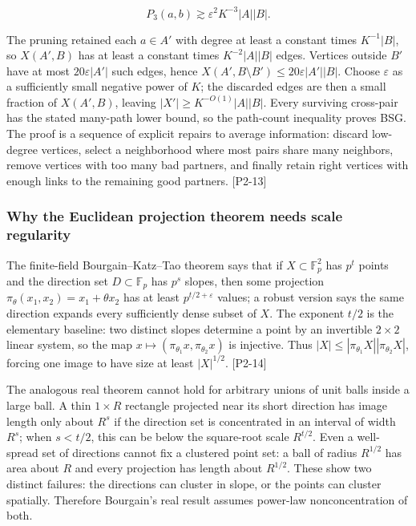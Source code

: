\[P_3(a,b)\gtrsim \varepsilon^2K^{-3}|A||B|.\]

The pruning retained each \(a\in A'\) with degree at least a constant times \(K^{-1}|B|\), so \(X(A',B)\) has at least a constant times \(K^{-2}|A||B|\) edges. Vertices outside \(B'\) have at most \(20\varepsilon|A'|\) such edges, hence \(X(A',B\setminus B')\le20\varepsilon|A'||B|\). Choose \(\varepsilon\) as a sufficiently small negative power of \(K\); the discarded edges are then a small fraction of \(X(A',B)\), leaving \(|X'|\ge K^{-O(1)}|A||B|\). Every surviving cross-pair has the stated many-path lower bound, so the path-count inequality proves BSG. The proof is a sequence of explicit repairs to average information: discard low-degree vertices, select a neighborhood where most pairs share many neighbors, remove vertices with too many bad partners, and finally retain right vertices with enough links to the remaining good partners. {[}P2-13{]}

\subsubsection{Why the Euclidean projection theorem needs scale regularity}\label{04-visual-computing-ii-ch033-why-the-euclidean-projection-theorem-needs-scale-regularity-1}

\hypertarget{04-visual-computing-ii-ch033-why-the-euclidean-projection-theorem-needs-scale-regularity-1}{}

The finite-field Bourgain--Katz--Tao theorem says that if \(X\subset\mathbb F_p^2\) has \(p^t\) points and the direction set \(D\subset\mathbb F_p\) has \(p^s\) slopes, then some projection \(\pi_\theta(x_1,x_2)=x_1+\theta x_2\) has at least \(p^{t/2+\varepsilon}\) values; a robust version says the same direction expands every sufficiently dense subset of \(X\). The exponent \(t/2\) is the elementary baseline: two distinct slopes determine a point by an invertible \(2\times2\) linear system, so the map \(x\mapsto(\pi_{\theta_1}x,\pi_{\theta_2}x)\) is injective. Thus \(|X|\le |\pi_{\theta_1}X||\pi_{\theta_2}X|\), forcing one image to have size at least \(|X|^{1/2}\). {[}P2-14{]}

The analogous real theorem cannot hold for arbitrary unions of unit balls inside a large ball. A thin \(1\times R\) rectangle projected near its short direction has image length only about \(R^s\) if the direction set is concentrated in an interval of width \(R^s\); when \(s<t/2\), this can be below the square-root scale \(R^{t/2}\). Even a well-spread set of directions cannot fix a clustered point set: a ball of radius \(R^{1/2}\) has area about \(R\) and every projection has length about \(R^{1/2}\). These show two distinct failures: the directions can cluster in slope, or the points can cluster spatially. Therefore Bourgain's real result assumes power-law nonconcentration of both.

